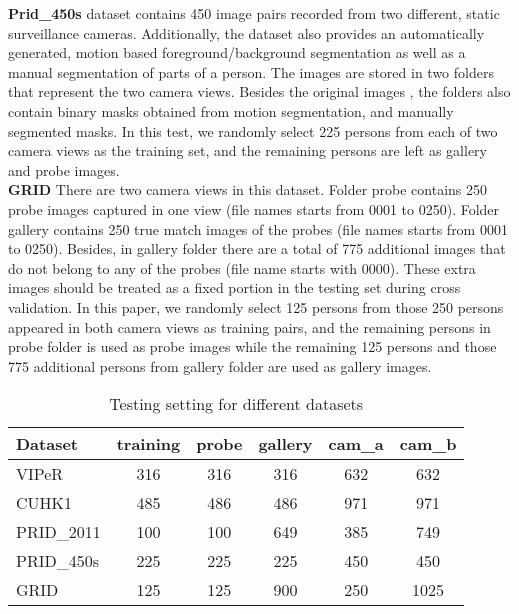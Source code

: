 \textbf{Prid\_450s} dataset contains 450 image pairs recorded from two different, static surveillance cameras. Additionally, the dataset also provides an automatically generated, motion based foreground/background segmentation as well as a manual segmentation of parts of a person. The images are stored in two folders that represent the two camera views. Besides the original images , the folders also contain binary masks obtained from motion segmentation, and manually segmented masks. In this test, we randomly select 225 persons from each of two camera views as the training set, and the remaining persons are left as gallery and probe images. \\
\textbf{GRID} There are two camera views in this dataset. Folder probe contains 250 probe images captured in one view (file names starts from 0001  to 0250). Folder gallery contains 250 true match images of the probes (file names starts from 0001  to 0250). Besides, in gallery folder there are a total of 775 additional images that do not belong to any of the probes (file name starts with 0000). These extra images should be treated as a fixed portion in the testing set during cross validation. In this paper, we randomly select 125 persons from those 250 persons appeared in both camera views as training pairs, and the remaining persons in probe folder is used as probe images while  the remaining 125 persons and those 775 additional persons from gallery folder are used as gallery images. \\
\begin{table}[H]
\centering
\caption{Testing setting for different datasets}
\begin{tabular}{|l|c|c|c|c|c|}
\hline
Dataset&training&probe&gallery&cam\_a&cam\_b\\
\hline
VIPeR&316&316&316&632&632\\
\hline
CUHK1&485&486&486&971&971\\
\hline
PRID\_2011&100&100&649&385&749\\
\hline
PRID\_450s&225&225&225&450&450\\
\hline
GRID&125&125&900&250&1025\\
\hline
\end{tabular}\\ 
\end{table}
